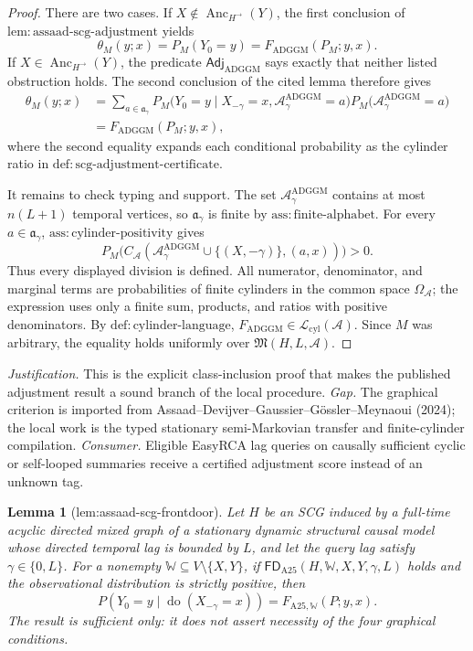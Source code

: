 \documentclass{article}
\newtheorem{lemma}{Lemma}
\begin{document}
\begin{proof}
There are two cases.  If
\(X\notin\operatorname{Anc}_{H^{\to}}(Y)\), the first conclusion of
\(\mathrm{lem:assaad\text{-}scg\text{-}adjustment}\) yields
\[
 \theta_M(y;x)=P_M(Y_0=y)
 =F_{\mathrm{ADGGM}}(P_M;y,x).
\]
If \(X\in\operatorname{Anc}_{H^{\to}}(Y)\), the predicate
\(\mathsf{Adj}_{\mathrm{ADGGM}}\) says exactly that neither listed obstruction holds.  The second conclusion of the cited lemma therefore gives
\[
 \begin{split}
 \theta_M(y;x)
 &=\sum_{a\in\mathfrak a_{\gamma}}
 P_M\bigl(Y_0=y\mid X_{-\gamma}=x,
 \mathcal A_{\gamma}^{\mathrm{ADGGM}}=a\bigr)
 P_M\bigl(\mathcal A_{\gamma}^{\mathrm{ADGGM}}=a\bigr)\\
 &=F_{\mathrm{ADGGM}}(P_M;y,x),
 \end{split}
\]
where the second equality expands each conditional probability as the cylinder ratio in \(\mathrm{def:scg\text{-}adjustment\text{-}certificate}\).

It remains to check typing and support.  The set
\(\mathcal A_{\gamma}^{\mathrm{ADGGM}}\) contains at most \(n(L+1)\) temporal vertices, so \(\mathfrak a_{\gamma}\) is finite by \(\mathrm{ass:finite\text{-}alphabet}\).  For every \(a\in\mathfrak a_{\gamma}\), \(\mathrm{ass:cylinder\text{-}positivity}\) gives
\[
 P_M\bigl(C_{\mathcal A}(\mathcal A_{\gamma}^{\mathrm{ADGGM}}\cup
 \{(X,-\gamma)\},(a,x))\bigr)>0.
\]
Thus every displayed division is defined.  All numerator, denominator, and marginal terms are probabilities of finite cylinders in the common space \(\Omega_{\mathcal A}\); the expression uses only a finite sum, products, and ratios with positive denominators.  By \(\mathrm{def:cylinder\text{-}language}\),
\(F_{\mathrm{ADGGM}}\in\mathcal L_{\mathrm{cyl}}(\mathcal A)\).  Since \(M\) was arbitrary, the equality holds uniformly over \(\mathfrak M(H,L,\mathcal A)\).
\end{proof}
\par\smallskip\noindent \textit{Justification.} This is the explicit class-inclusion proof that makes the published adjustment result a sound branch of the local procedure. \textit{Gap.} The graphical criterion is imported from Assaad--Devijver--Gaussier--Gössler--Meynaoui (2024); the local work is the typed stationary semi-Markovian transfer and finite-cylinder compilation. \textit{Consumer.} Eligible EasyRCA lag queries on causally sufficient cyclic or self-looped summaries receive a certified adjustment score instead of an unknown tag.

\begin{lemma}[lem:assaad-scg-frontdoor]\label{lem:assaad-scg-frontdoor}
Let \(H\) be an SCG induced by a full-time acyclic directed mixed graph of a stationary dynamic structural causal model whose directed temporal lag is bounded by \(L\), and let the query lag satisfy \(\gamma\in\{0,L\}\).  For a nonempty \(\mathbb W\subseteq V\setminus\{X,Y\}\), if \(\mathsf{FD}_{\mathrm{A25}}(H,\mathbb W,X,Y,\gamma,L)\) holds and the observational distribution is strictly positive, then
\[
 P(Y_0=y\mid\operatorname{do}(X_{-\gamma}=x))
 =F_{\mathrm{A25},\mathbb W}(P;y,x).
\]
The result is sufficient only: it does not assert necessity of the four graphical conditions.
\end{lemma}
\end{document}
